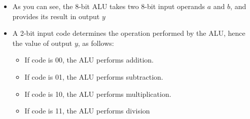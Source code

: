 \begin{itemize}
  \item As you can see, the 8-bit ALU takes two 8-bit input operands $a$ and $b$, and provides its result in output $y$

  \item A 2-bit input code determines the operation performed by the ALU, hence the value of output $y$, as follows:

    \begin{itemize}

      \item If code is 00, the ALU performs addition. 

      \item If code is 01, the ALU performs subtraction. 

      \item If code is 10, the ALU performs multiplication. 

      \item If code is 11, the ALU performs division 

    \end{itemize}

\end{itemize}



